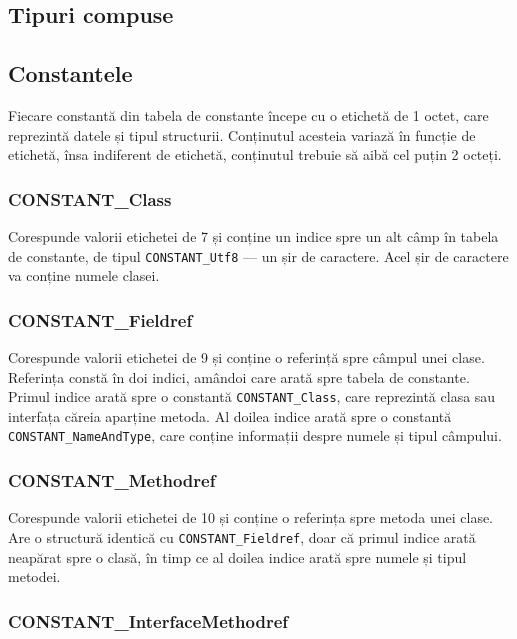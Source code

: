 \subsection{Tipuri compuse}

\subsection{Constantele}

Fiecare constantă din tabela de constante începe cu o etichetă de 1
octet, care reprezintă datele și tipul structurii. Conținutul acesteia
variază în funcție de etichetă, însa indiferent de etichetă, conținutul
trebuie să aibă cel puțin 2 octeți.

\subsubsection{CONSTANT\_Class}

Corespunde valorii etichetei de 7 și conține un indice spre un alt câmp
în tabela de constante, de tipul \texttt{CONSTANT\_Utf8} --- un șir de
caractere. Acel șir de caractere va conține numele clasei.

\subsubsection{CONSTANT\_Fieldref}

Corespunde valorii etichetei de 9 și conține o referință spre câmpul
unei clase. Referința constă în doi indici, amândoi care arată spre
tabela de constante. Primul indice arată spre o constantă
\texttt{CONSTANT\_Class}, care reprezintă clasa sau interfața căreia
aparține metoda. Al doilea indice arată spre o constantă
\texttt{CONSTANT\_NameAndType}, care conține informații despre numele și
tipul câmpului.

\subsubsection{CONSTANT\_Methodref}

Corespunde valorii etichetei de 10 și conține o referința spre metoda
unei clase. Are o structură identică cu \texttt{CONSTANT\_Fieldref},
doar că primul indice arată neapărat spre o clasă, în timp ce al doilea
indice arată spre numele și tipul metodei.

\subsubsection{CONSTANT\_InterfaceMethodref}

